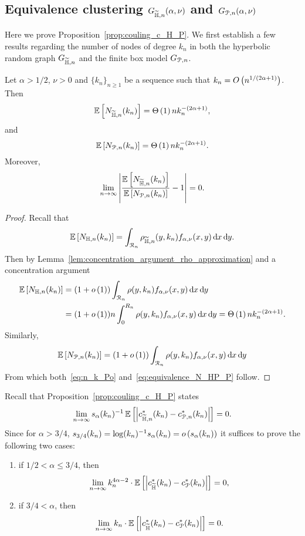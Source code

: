 \subsection{Equivalence clustering $G_{\widetilde{\mathbb{H}},n}(\alpha,\nu)$ and $G_{{\mathcal P},n}(\alpha,\nu)$}\label{ssec:coupling_HP_ast_P}


Here we prove Proposition~\ref{prop:couling_c_H_P}. We first establish a few results regarding the number of nodes of degree $k_n$ in both the hyperbolic random graph $G_{\widetilde{\mathbb{H}},n}$ and the finite box model $G_{{\mathcal P},n}$.

\begin{lemma}\label{lem:N_k_HP_P}
Let $\alpha > 1/2$, $\nu > 0$ and $\{k_n\}_{n\ge 1}$ be a sequence such that $k_n = O\left(n^{1/(2\alpha + 1)}\right)$. Then
\begin{equation} \label{eq:n_k_Hyp}
	\mathbb{E}\left[N_{\widetilde{\mathbb{H}},n}(k_n)\right] = \Theta\left(1\right) n k_n^{-(2\alpha + 1)},
\end{equation}
and
\begin{equation} \label{eq:n_k_Po}
	\mathbb{E}\left[N_{{\mathcal P},n}(k_n)\right] = \Theta\left(1\right) n k_n^{-(2\alpha + 1)}.
\end{equation}
Moreover,
\begin{equation}\label{eq:equivalence_N_HP_P}
	\lim_{n \to \infty} \left|\frac{\mathbb{E}\left[N_{\widetilde{\mathbb{H}},n}(k_n)\right]}{\mathbb{E}\left[N_{{\mathcal P},n}(k_n)\right]} - 1\right| = 0.
\end{equation}
\end{lemma}

\begin{proof}
Recall that
\[
	\mathbb{E}\left[N_{\mathbb{H},n}(k_n)\right] = \int_{{\mathcal R}_n} \rho_{\widetilde{\mathbb{H}},n}(y,k_n) f_{\alpha,\nu}(x,y) \operatorname{\mathrm{d}\hspace{-2pt}} x \operatorname{\mathrm{d}\hspace{-2pt}} y. 
\]
Then by Lemma~\ref{lem:concentration_argument_rho_approximation} and a concentration argument
\begin{align*}
	\mathbb{E}\left[N_{\mathbb{H},n}(k_n)\right] &= (1 + o\left(1\right))\int_{{\mathcal R}_n} \rho(y,k_n) f_{\alpha,\nu}(x,y) \operatorname{\mathrm{d}\hspace{-2pt}} x \operatorname{\mathrm{d}\hspace{-2pt}} y\\
	&= (1 + o\left(1\right)) n \int_{0}^{R_n} \rho(y,k_n) f_{\alpha,\nu}(x,y) \operatorname{\mathrm{d}\hspace{-2pt}} x \operatorname{\mathrm{d}\hspace{-2pt}} y = \Theta\left(1\right)n k_n^{-(2\alpha + 1)}.
\end{align*}
Similarly,
\[
	\mathbb{E}\left[N_{{\mathcal P},n}(k_n)\right] = (1 + o\left(1\right))\int_{{\mathcal R}_n} \rho(y,k_n) f_{\alpha,\nu}(x,y) \operatorname{\mathrm{d}\hspace{-2pt}} x \operatorname{\mathrm{d}\hspace{-2pt}} y
\]
From which both~\eqref{eq:n_k_Po} and~\eqref{eq:equivalence_N_HP_P} follow.
\end{proof}

Recall that Proposition~\ref{prop:couling_c_H_P} states
\[
	\lim_{n \to \infty} s_\alpha(k_n)^{-1} \, \mathbb{E}\left[\left|c_{\widetilde{\mathbb{H}},n}^\ast(k_n) - c_{{\mathcal P},n}^\ast(k_n)\right|\right] = 0.
\]
Since for $\alpha > 3/4$, $s_{3/4}(k_n) = \log(k_n)^{-1} s_{\alpha}(k_n) = o\left(s_{\alpha}(k_n)\right)$ it suffices to prove the following two cases:
\begin{enumerate}
\item if $1/2 < \alpha \leq 3/4$, then
\[
	\lim_{n\to \infty} k_n^{4\alpha -2}\cdot \mathbb{E}\left[\left|  c_{\widetilde{\mathbb{H}}}^\ast(k_n) - c_{{\mathcal P}}^\ast(k_n)\right|\right]=0,
\]
\item if $3/4 < \alpha$, then
\[ 
	\lim_{n\to \infty} k_n \cdot \mathbb{E}\left[\left|  c_{\widetilde{\mathbb{H}}}^\ast(k_n) - c_{{\mathcal P}}^\ast(k_n)\right|\right]=0.
\]
\end{enumerate}


